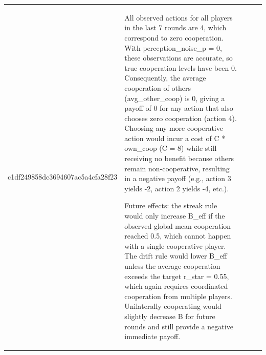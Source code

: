 \begin{tabular}{lp{8cm}ll l}
c1df249858dc3694607ac5a4cfa28f23 & All observed actions for all players in the last 7 rounds are 4, which correspond to zero cooperation. With perception\_noise\_p = 0, these observations are accurate, so true cooperation levels have been 0. Consequently, the average cooperation of others (avg\_other\_coop) is 0, giving a payoff of 0 for any action that also chooses zero cooperation (action 4). Choosing any more cooperative action would incur a cost of C * own\_coop (C = 8) while still receiving no benefit because others remain non‑cooperative, resulting in a negative payoff (e.g., action 3 yields -2, action 2 yields -4, etc.).

Future effects: the streak rule would only increase B\_eff if the observed global mean cooperation reached 0.5, which cannot happen with a single cooperative player. The drift rule would lower B\_eff unless the average cooperation exceeds the target r\_star = 0.55, which again requires coordinated cooperation from multiple players. Unilaterally cooperating would slightly decrease B for future rounds and still provide a negative immediate payoff.


\end{tabular}
